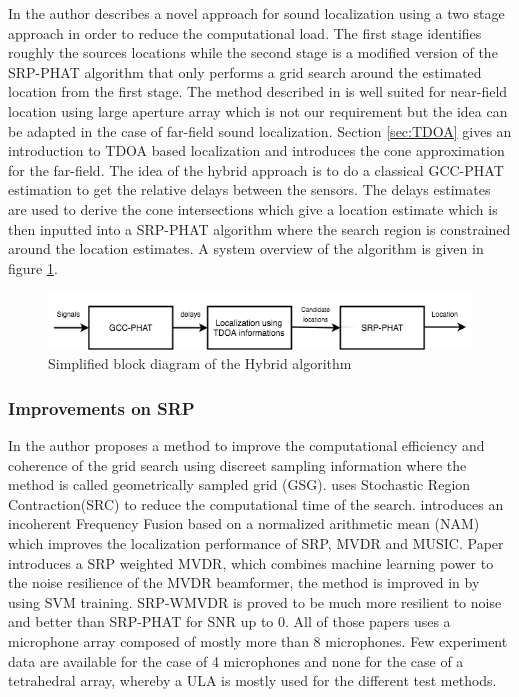 In \cite{peterson2005hybrid} the author describes a novel approach for sound localization using a two stage approach in order to reduce the computational load. The first stage identifies roughly the sources locations while the second stage is a modified version of the SRP-PHAT algorithm that only performs a grid search around the estimated location from the first stage.  The method described in \cite{peterson2005hybrid} is well suited for near-field location using large aperture array which is not our requirement but the idea can be adapted in the case of far-field sound localization. Section \ref{sec:TDOA} gives an introduction to TDOA based localization and introduces the cone approximation for the far-field. The idea of the hybrid approach is to do a classical GCC-PHAT estimation to get the relative delays between the sensors. The delays estimates are used to derive the cone intersections which give a location estimate which is then inputted into a SRP-PHAT algorithm where the search region is constrained around the location estimates. A system overview of the algorithm is given in figure \ref{fig:hybridalgo}.

\begin{figure}[H]
    \centering
    \includegraphics[width=1\textwidth]{Figures/hybridalgo.png}
    \caption{Simplified block diagram of the Hybrid algorithm}
    \label{fig:hybridalgo}
\end{figure}

\subsubsection{Improvements on SRP}

In \cite{salvati2017exploiting} the author proposes a method to improve the computational efficiency and coherence of the grid search using discreet sampling information where the method is called geometrically sampled grid (GSG). \cite{do2007real} uses Stochastic Region Contraction(SRC) to reduce the computational time of the search. \cite{salvati2014incoherent} introduces an incoherent Frequency Fusion based on a normalized arithmetic mean (NAM) which improves the localization performance of SRP, MVDR and MUSIC. Paper \cite{salvati2015frequency} introduces a SRP weighted MVDR, which combines machine learning power to the noise resilience of the MVDR beamformer, the method is improved in \cite{salvati2016use} by using SVM training. SRP-WMVDR is proved to be much more resilient to noise and better than SRP-PHAT for SNR up to 0. All of those papers uses a microphone array composed of mostly more than 8 microphones. Few experiment data are available for the case of 4 microphones and none for the case of a tetrahedral array, whereby a ULA is mostly used for the different test methods.


